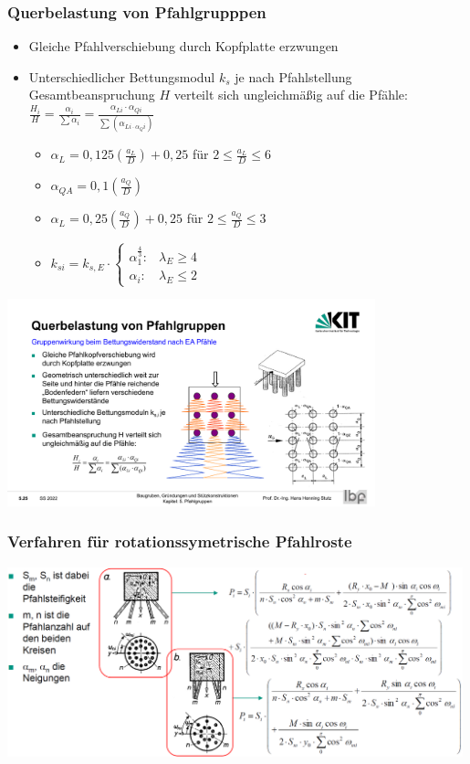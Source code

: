 \documentclass[fleqn,twoside]{article}
\begin{document}
\subsubsection{Querbelastung von Pfahlgrupppen}
\begin{minipage}{0.58\textwidth}
\begin{itemize}
    \item Gleiche Pfahlverschiebung durch Kopfplatte erzwungen
    \item Unterschiedlicher Bettungsmodul $k_s$ je nach Pfahlstellung
    Gesamtbeanspruchung $H$ verteilt sich ungleichmäßig auf die Pfähle: $\frac{H_i}{H}=\frac{\alpha_i}{\sum\alpha_i}=\frac{\alpha_{Li}\cdot\alpha_{Qi}}{\sum(\alpha_{Li\cdot\alpha_Qi})}$
    \begin{itemize}
        \item $\alpha_L=0,125\left(\frac{a_L}{D}\right)+0,25$ für $2\le\frac{a_L}{D}\le6$
        \item $\alpha_{QA}=0,1\left(\frac{a_Q}{D}\right)$
        \item $\alpha_L=0,25\left(\frac{a_Q}{D}\right)+0,25$ für $2\le\frac{a_Q}{D}\le3$
        \item $k_{si}=k_{s,E}\cdot\left\{\begin{array}{cc}
           \alpha_1^{\frac43}:  &\lambda_E\ge4  \\
            \alpha_i: & \lambda_E \le2
        \end{array} \right.$
    \end{itemize}
\end{itemize}
\end{minipage}
\begin{minipage}{0.4\textwidth}
    \includegraphics[width=0.8\textwidth]{Grafiken/Pfahlgruppe_Lateral.pdf}
\end{minipage}
\subsubsection{Verfahren für rotationssymetrische Pfahlroste}
\includegraphics[width=0.99\textwidth]{Grafiken/Rotsym_Pfahl.png}\\
\end{document}
